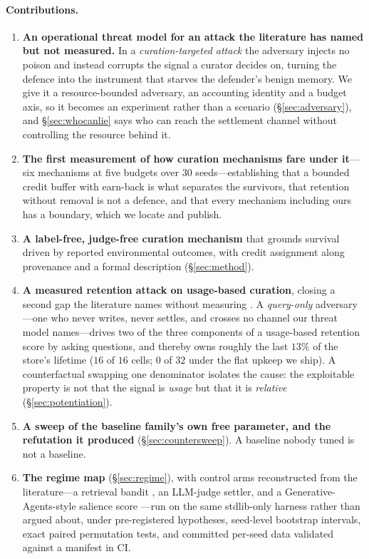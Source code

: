 \paragraph{Contributions.}
\begin{enumerate}[leftmargin=1.2em, itemsep=1pt, topsep=2pt]
\item \textbf{An operational threat model for an attack the literature
has named but not measured.} In a \emph{curation-targeted attack} the
adversary injects no poison and instead corrupts the signal a curator
decides on, turning the defence into the instrument that starves the
defender's benign memory. We give it a resource-bounded adversary, an
accounting identity and a budget axis, so it becomes an experiment rather
than a scenario (\S\ref{sec:adversary}), and \S\ref{sec:whocanlie} says
who can reach the settlement channel without controlling the resource
behind it.
\item \textbf{The first measurement of how curation mechanisms fare under
it}---six mechanisms at five budgets over 30 seeds---establishing that a
bounded credit buffer with earn-back is what separates the survivors,
that retention without removal is not a defence, and that every
mechanism including ours has a boundary, which we locate and publish.
\item \textbf{A label-free, judge-free curation mechanism} that grounds
survival driven by reported environmental outcomes, with credit assignment
along provenance and a formal description (\S\ref{sec:method}).
\item \textbf{A measured retention attack on usage-based curation},
closing a second gap the literature names without measuring
\citep{lin2026memsurvey}. A \emph{query-only} adversary---one who never
writes, never settles, and crosses no channel our threat model
names---drives two of the three components of a usage-based retention
score by asking questions, and thereby owns roughly the last $13\%$ of
the store's lifetime ($16$ of $16$ cells; $0$ of $32$ under the flat
upkeep we ship). A counterfactual swapping one denominator isolates the
cause: the exploitable property is not that the signal is \emph{usage}
but that it is \emph{relative} (\S\ref{sec:potentiation}).
\item \textbf{A sweep of the baseline family's own free parameter, and
the refutation it produced} (\S\ref{sec:countersweep}). A baseline nobody
tuned is not a baseline.
\item \textbf{The regime map} (\S\ref{sec:regime}), with control arms
reconstructed from the literature---a retrieval bandit
\citep{xu2026ael}, an LLM-judge settler, and a Generative-Agents-style
salience score \citep{park2023generative}---run on the same stdlib-only
harness rather than argued about, under pre-registered hypotheses,
seed-level bootstrap intervals, exact paired permutation tests, and
committed per-seed data validated against a manifest in CI.
\end{enumerate}
